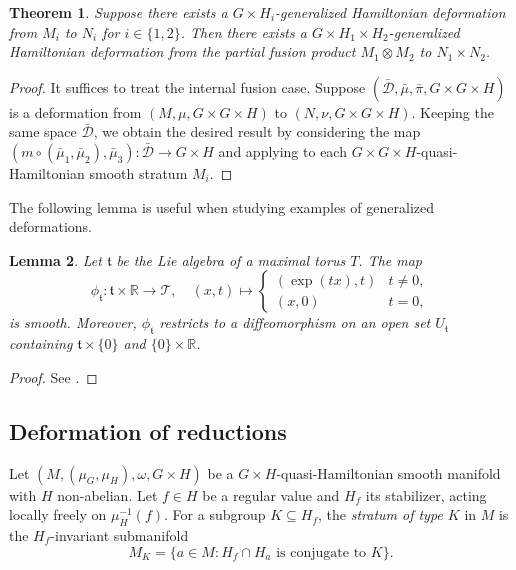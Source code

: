 \documentclass[reqno]{amsart}
\theoremstyle{plain}
\newtheorem{Thm}{Theorem}[section]
\newtheorem{Lem}[Thm]{Lemma}
\theoremstyle{definition}
\begin{document}
\begin{Thm}\label{thm 6.5}
Suppose there exists a $G\times H_i$-generalized Hamiltonian deformation from $M_i$ to $N_i$ for $i \in \{1,2\}$. Then there exists a $G\times H_1 \times H_2$-generalized Hamiltonian deformation from the partial fusion product $M_1 \otimes M_2$ to $N_1 \times N_2$.
\end{Thm}

\begin{proof}
It suffices to treat the internal fusion case. Suppose $(\bar{\mathcal{D}}, \bar{\mu}, \bar{\pi}, G\times G\times H)$ is a deformation from $(M, \mu, G\times G\times H)$ to $(N, \nu, G\times G\times H)$. Keeping the same space $\bar{\mathcal{D}}$, we obtain the desired result by considering the map $(m \circ (\bar{\mu}_1, \bar{\mu}_2), \bar{\mu}_3): \bar{\mathcal{D}} \to G \times H$ and applying \cite[Theorem~3.1]{JMM2025deformations} to each $G\times G\times H$-quasi-Hamiltonian smooth stratum $M_i$.
\end{proof}

The following lemma is useful when studying examples of generalized deformations.

\begin{Lem}\label{lem 6.4}
Let $\mathfrak{t}$ be the Lie algebra of a maximal torus $T$. The map
\[
\phi_{\mathfrak{t}}: \mathfrak{t} \times \mathbb{R} \to \mathcal{T}, \quad (x,t) \mapsto \begin{cases} (\exp(tx), t) & t \neq 0, \\ (x, 0) & t = 0, \end{cases}
\]
is smooth. Moreover, $\phi_{\mathfrak{t}}$ restricts to a diffeomorphism on an open set $U_{\mathfrak{t}}$ containing $\mathfrak{t} \times \{0\}$ and $\{0\} \times \mathbb{R}$.
\end{Lem}

\begin{proof}
See \cite[Lemma~2.1]{JMM2025deformations}.
\end{proof}

\subsection{Deformation of reductions}

Let $(M, (\mu_G, \mu_H), \omega, G\times H)$ be a $G\times H$-quasi-Hamiltonian smooth manifold with $H$ non-abelian. Let $f \in H$ be a regular value and $H_f$ its stabilizer, acting locally freely on $\mu_H^{-1}(f)$. For a subgroup $K \subseteq H_f$, the \emph{stratum of type $K$} in $M$ is the $H_f$-invariant submanifold
\[
M_K = \{a \in M : H_f \cap H_a \text{ is conjugate to } K\}.
\]
\end{document}
